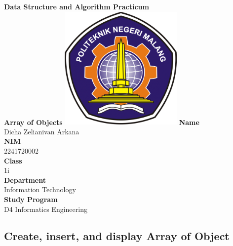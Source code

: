 \documentclass[12pt,titlepage]{article}
\newcommand{\vSubject}{Data Structure and Algorithm Practicum}
\newcommand{\vSubtitle}{Array of Objects}
\newcommand{\vName}{Dicha Zelianivan Arkana}
\newcommand{\vNIM}{2241720002}
\newcommand{\vClass}{1i}
\newcommand{\vDepartment}{Information Technology}
\newcommand{\vStudyProgram}{D4 Informatics Engineering}
\begin{document}
\begin{titlepage}
    \centering
    \vfill
    {\bfseries\LARGE
        \vSubject\\
        \vskip0.25cm
        \vSubtitle
    }
    \vfill
    \includegraphics[width=6cm]{images/polinema-logo.png}
    \vfill
    {
        \textbf{Name}\\
        \vName\\
        \vskip0.5cm
        \textbf{NIM}\\
        \vNIM\\
        \vskip0.5cm
        \textbf{Class}\\
        \vClass\\
        \vskip0.5cm
        \textbf{Department}\\
        \vDepartment\\
        \vskip0.5cm
        \textbf{Study Program}\\
        \vStudyProgram
    }
\end{titlepage}

\tableofcontents


\setcounter{section}{1}
\setcounter{subsection}{1}

\subsection{Create, insert, and display Array of Object}
\end{document}
